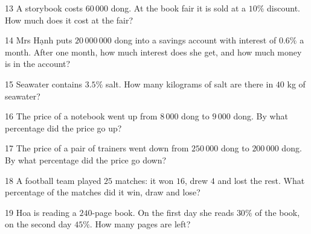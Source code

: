 \gap
\begin{probbox}{13}{\relax}
A storybook costs $60\,000$ dong. At the book fair it is sold at a $10\%$ discount. How much does it cost at the fair?
\end{probbox}
\gap
\begin{probbox}{14}{\relax}
Mrs Hạnh puts $20\,000\,000$ dong into a savings account with interest of $0.6\%$ a month. After one month, how much interest does she get, and how much money is in the account?
\end{probbox}
\gap
\begin{probbox}{15}{\relax}
Seawater contains $3.5\%$ salt. How many kilograms of salt are there in $40$ kg of seawater?
\end{probbox}
\gap
\begin{probbox}{16}{\relax}
The price of a notebook went up from $8\,000$ dong to $9\,000$ dong. By what percentage did the price go up?
\end{probbox}
\gap
\begin{probbox}{17}{\relax}
The price of a pair of trainers went down from $250\,000$ dong to $200\,000$ dong. By what percentage did the price go down?
\end{probbox}
\gap
\begin{probbox}{18}{\relax}
A football team played $25$ matches: it won $16$, drew $4$ and lost the rest. What percentage of the matches did it win, draw and lose?
\end{probbox}
\gap
\begin{probbox}{19}{\relax}
Hoa is reading a $240$-page book. On the first day she reads $30\%$ of the book, on the second day $45\%$. How many pages are left?
\end{probbox}
